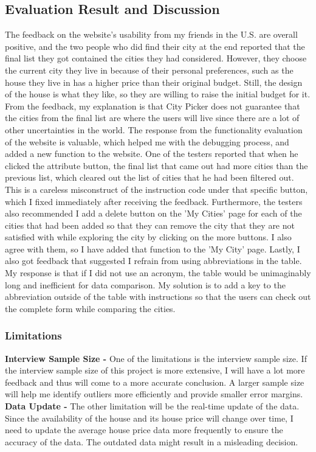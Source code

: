 \documentclass[10pt,twocolumn]{article}
\begin{document}
\subsection{Evaluation Result and Discussion}
The feedback on the website's usability from my friends in the U.S. are overall positive, and the two people who did find their city at the end reported that the final list they got contained the cities they had considered. However, they choose the current city they live in because of their personal preferences, such as the house they live in has a higher price than their original budget. Still, the design of the house is what they like, so they are willing to raise the initial budget for it. From the feedback, my explanation is that City Picker does not guarantee that the cities from the final list are where the users will live since there are a lot of other uncertainties in the world. 
\newline
\indent
The response from the functionality evaluation of the website is valuable, which helped me with the debugging process, and added a new function to the website. One of the testers reported that when he clicked the attribute button, the final list that came out had more cities than the previous list, which cleared out the list of cities that he had been filtered out. This is a careless misconstruct of the instruction code under that specific button, which I fixed immediately after receiving the feedback. Furthermore, the testers also recommended I add a delete button on the 'My Cities' page for each of the cities that had been added so that they can remove the city that they are not satisfied with while exploring the city by clicking on the more buttons. I also agree with them, so I have added that function to the 'My City' page. Lastly, I also got feedback that suggested I refrain from using abbreviations in the table. My response is that if I did not use an acronym, the table would be unimaginably long and inefficient for data comparison. My solution is to add a key to the abbreviation outside of the table with instructions so that the users can check out the complete form while comparing the cities.
\subsubsection{Limitations}
\textbf{Interview Sample Size - }
One of the limitations is the interview sample size. If the interview sample size of this project is more extensive, I will have a lot more feedback and thus will come to a more accurate conclusion. A larger sample size will help me identify outliers more efficiently and provide smaller error margins.
\newline
\textbf{Data Update - } 
The other limitation will be the real-time update of the data. Since the availability of the house and its house price will change over time, I need to update the average house price data more frequently to ensure the accuracy of the data. The outdated data might result in a misleading decision.
\end{document}
